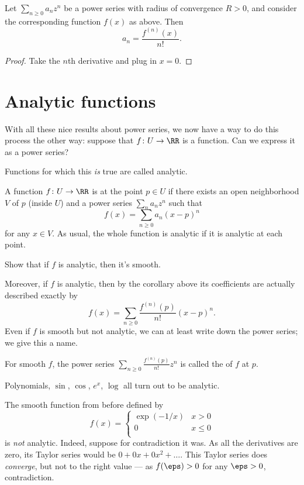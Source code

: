 \begin{corollary}
	Let $\sum_{n \ge 0} a_n z^n$ be a power series
	with radius of convergence $R > 0$,
	and consider the corresponding function $f(x)$ as above.
	Then
	\[ a_n = \frac{f^{(n)}(x)}{n!}. \]
\end{corollary}
\begin{proof}
	Take the $n$th derivative and plug in $x=0$.
\end{proof}

\section{Analytic functions}
With all these nice results about power series,
we now have a way to do this process the other way:
suppose that $f \colon U \to \RR$ is a function.
Can we express it as a power series?

Functions for which this \emph{is} true
are called analytic.
\begin{definition}
	A function $f \colon U \to \RR$ is  at
	the point $p \in U$
	if there exists an open neighborhood $V$ of $p$ (inside $U$)
	and a power series $\sum_n a_n z^n$ such that
	\[ f(x) = \sum_{n \ge 0} a_n (x-p)^n \]
	for any $x \in V$.
	As usual, the whole function is analytic
	if it is analytic at each point.
\end{definition}
\begin{ques}
	Show that if $f$ is analytic, then it's smooth.
\end{ques}
Moreover, if $f$ is analytic,
then by the corollary above its coefficients are
actually described exactly by
\[ f(x) = \sum_{n \ge 0} \frac{f^{(n)}(p)}{n!} (x-p)^n. \]
Even if $f$ is smooth but not analytic,
we can at least write down the power series;
we give this a name.
\begin{definition}
	For smooth $f$,
	the power series $\sum_{n \ge 0} \frac{f^{(n)}(p)}{n!} z^n$
	is called the  of $f$ at $p$.
\end{definition}

\begin{example}
	\listhack
	\label{ex:nonanalytic}
	\begin{enumerate}[(a)]
		\ii Polynomials, $\sin$, $\cos$, $e^x$, $\log$
		all turn out to be analytic.

		\ii The smooth function from before defined by
		\[ f(x) = \begin{cases}
				\exp(-1/x) & x > 0 \\
				0 & x \le 0 \\
			\end{cases}
		\]
		is \emph{not} analytic.
		Indeed, suppose for contradiction it was.
		As all the derivatives are zero,
		its Taylor series would be $0 + 0x + 0x^2 + \dots$.
		This Taylor series does \emph{converge}, but not to the right value ---
		as $f(\eps) > 0$ for any $\eps > 0$, contradiction.
	\end{enumerate}
\end{example}

